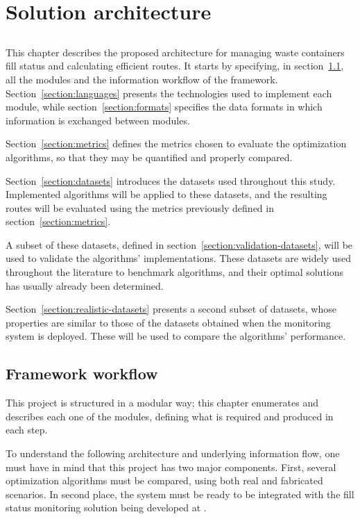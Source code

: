 \chapter{Solution architecture}
\label{chap:evaluation-framework}

\section*{}

This chapter describes the proposed architecture for managing waste containers
fill status and calculating efficient routes. It starts by specifying, in
section~\ref{section:framework}, all the modules and the information workflow of
the framework. Section~\ref{section:languages} presents the technologies used to
implement each module, while section~\ref{section:formats} specifies the data
formats in which information is exchanged between modules.

Section~\ref{section:metrics} defines the metrics chosen to evaluate the
optimization algorithms, so that they may be quantified and properly compared.

Section~\ref{section:datasets} introduces the datasets used throughout this
study. Implemented algorithms will be applied to these datasets, and the
resulting routes will be evaluated using the metrics previously defined in
section~\ref{section:metrics}.

A subset of these datasets, defined in
section~\ref{section:validation-datasets}, will be used to validate the
algorithms' implementations. These datasets are widely used throughout the
literature to benchmark algorithms, and their optimal solutions has usually
already been determined.

Section~\ref{section:realistic-datasets} presents a
second subset of datasets, whose properties are similar to those of the datasets
obtained when the monitoring system is deployed. These will be used to compare
the algorithms' performance.




\section{Framework workflow}
\label{section:framework}

This project is structured in a modular way; this chapter enumerates and
describes each one of the modules, defining what is required and produced in
each step. 

To understand the following architecture and underlying information flow, one
must have in mind that this project has two major components. First, several
optimization algorithms must be compared, using both real and fabricated
scenarios. In second place, the system must be ready to be integrated with the
fill status monitoring solution being developed at \fhp{}.

